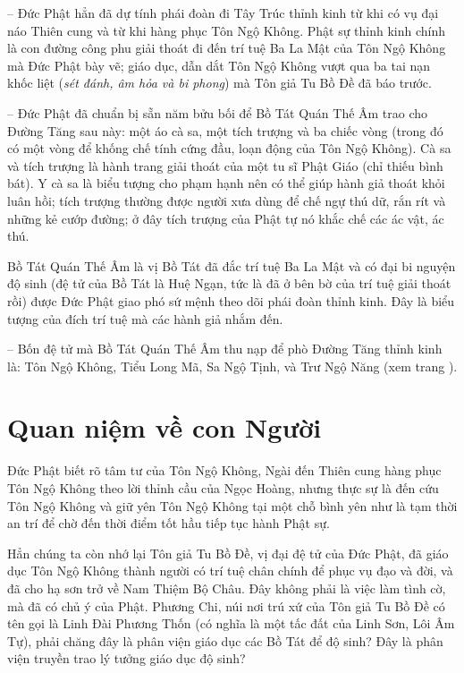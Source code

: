 -- Đức Phật hẳn đã dự tính phái đoàn đi Tây Trúc thỉnh kinh từ khi có vụ đại náo Thiên cung và từ khi hàng phục Tôn Ngộ Không. Phật sự thỉnh kinh chính là con đường công phu giải thoát đi đến trí tuệ Ba La Mật của Tôn Ngộ Không mà Đức Phật bày vẽ; giáo dục, dẫn dắt Tôn Ngộ Không vượt qua ba tai nạn khốc liệt (\emph{sét đánh, âm hỏa và bi phong}) mà Tôn giả Tu Bồ Đề đã báo trước.

-- Đức Phật đã chuẩn bị sẵn năm bửu bối để Bồ Tát Quán Thế Âm trao cho Đường Tăng sau này: một áo cà sa, một tích trượng và ba chiếc vòng (trong đó có một vòng để khống chế tính cứng đầu, loạn động của Tôn Ngộ Không). Cà sa và tích trượng là hành trang giải thoát của một tu sĩ Phật Giáo (chỉ thiếu bình bát). Y cà sa là biểu tượng cho phạm hạnh nên có thể giúp hành giả thoát khỏi luân hồi; tích trượng thường được người xưa dùng để chế ngự thú dữ, rắn rít và những kẻ cướp đường; ở đây tích trượng của Phật tự nó khắc chế các ác vật, ác thú.

Bồ Tát Quán Thế Âm là vị Bồ Tát đã đắc trí tuệ Ba La Mật và có đại bi nguyện độ sinh (đệ tử của Bồ Tát là Huệ Ngạn, tức là đã ở bên bờ của trí tuệ giải thoát rồi) được Đức Phật giao phó sứ mệnh theo dõi phái đoàn thỉnh kinh. Đây là biểu tượng của đích trí tuệ mà các hành giả nhắm đến.

-- Bốn đệ tử mà Bồ Tát Quán Thế Âm thu nạp để phò Đường Tăng thỉnh kinh là: Tôn Ngộ Không, Tiểu Long Mã, Sa Ngộ Tịnh, và Trư Ngộ Năng (xem  trang \pageref{sec:qua_cac_nhan_vat_chinh}).

\section{Quan niệm về con Người} %
\label{sec:8_con_nguoi}

Đức Phật biết rõ tâm tư của Tôn Ngộ Không, Ngài đến Thiên cung hàng phục Tôn Ngộ Không theo lời thỉnh cầu của Ngọc Hoàng, nhưng thực sự là đến cứu Tôn Ngộ Không và giữ yên Tôn Ngộ Không tại một chỗ bình yên như là tạm thời an trí để chờ đến thời điểm tốt hầu tiếp tục hành Phật sự.

Hẳn chúng ta còn nhớ lại Tôn giả Tu Bồ Đề, vị đại đệ tử của Đức Phật, đã giáo dục Tôn Ngộ Không thành người có trí tuệ chân chính để phục vụ đạo và đời, và đã cho hạ sơn trở về Nam Thiệm Bộ Châu. Đây không phải là việc làm tình cờ, mà đã có chủ ý của Phật. Phương Chi, núi nơi trú xứ của Tôn giả Tu Bồ Đề có tên gọi là Linh Đài Phương Thốn (có nghĩa là một tấc đất của Linh Sơn, Lôi Âm Tự), phải chăng đây là phân viện giáo dục các Bồ Tát để độ sinh? Đây là phân viện truyền trao lý tưởng giáo dục độ sinh?

